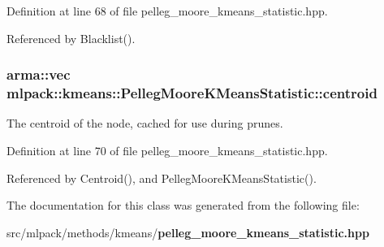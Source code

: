 Definition at line 68 of file pelleg\+\_\+moore\+\_\+kmeans\+\_\+statistic.\+hpp.



Referenced by Blacklist().

\subsubsection[{centroid}]{\setlength{\rightskip}{0pt plus 5cm}arma\+::vec mlpack\+::kmeans\+::\+Pelleg\+Moore\+K\+Means\+Statistic\+::centroid\hspace{0.3cm}{\ttfamily [private]}}\label{classmlpack_1_1kmeans_1_1PellegMooreKMeansStatistic_a7292a488338c13c91622326c7f4d7ee0}


The centroid of the node, cached for use during prunes. 



Definition at line 70 of file pelleg\+\_\+moore\+\_\+kmeans\+\_\+statistic.\+hpp.



Referenced by Centroid(), and Pelleg\+Moore\+K\+Means\+Statistic().



The documentation for this class was generated from the following file\+:\begin{DoxyCompactItemize}
\item 
src/mlpack/methods/kmeans/{\bf pelleg\+\_\+moore\+\_\+kmeans\+\_\+statistic.\+hpp}\end{DoxyCompactItemize}
